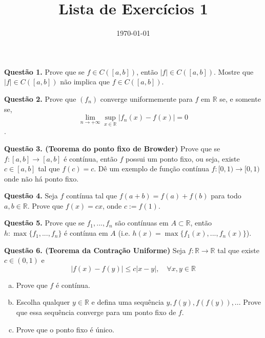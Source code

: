 \documentclass[10pt]{article}
\title{Lista de Exercícios 1}
\author{}
\date{\today}
\theoremstyle{definition}
\begin{document}
\maketitle

\noindent
\textbf{Questão 1.} Prove que se $f \in C([a,b])$, então $|f| \in C([a,b])$. Mostre que
$|f| \in C([a,b])$ não implica que $f \in C([a,b])$.
\vspace{5mm}

\noindent
\textbf{Questão 2.} Prove que $(f_n)$ converge uniformemente
para $f$ em $\mathbb R$ se, e somente se,
$$\lim_{n\to +\infty}\sup_{x \in \mathbb R} |f_n(x) - f(x)|= 0$$.
\vspace{5mm}

\noindent
\textbf{Questão 3. (Teorema do ponto fixo de Browder)} Prove que se
$f:[a,b]\to [a,b]$ é contínua, então $f$ possui um ponto fixo, ou seja, existe 
$c \in [a,b]$ tal que $f(c)=c$. Dê um exemplo de função contínua $f:[0,1)\to [0,1)$
onde não há ponto fixo.
\vspace{5mm}

\noindent
\textbf{Questão 4.} Seja $f$ contínua tal que $f(a+b)= f(a)+f(b)$ para todo
$a,b \in \mathbb R$. Prove que $f(x)=cx$, onde $c:=f(1)$.
\vspace{5mm}

\noindent
\textbf{Questão 5.} Prove que se $f_1,...,f_n$ são contínuas em $A \subset \mathbb R$,
então $h:\max\{f_1,...,f_n\}$ é contínua em $A$ (i.e. $h(x) = \max\{f_1(x),...,f_n(x)\}$).
\vspace{5mm}

\noindent
\textbf{Questão 6. (Teorema da Contração Uniforme)}
Seja $f:\mathbb R \to \mathbb R$ tal que existe $c \in (0,1)$ e
$$
|f(x) - f(y)| \leq c|x-y|, \quad \forall x,y \in \mathbb R
$$
\begin{enumerate}[(a)]
	\item Prove que $f$ é contínua.
	\item Escolha qualquer $y \in \mathbb R$ e defina uma sequência $y, f(y), f(f(y)),...$
	Prove que essa sequência converge para um ponto fixo de $f$.
	\item Prove que o ponto fixo é único.
\end{enumerate}


\nocite{*}

  
  
\end{document}
